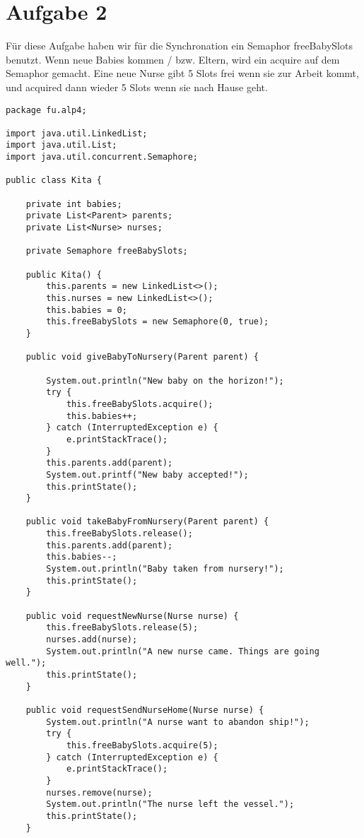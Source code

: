 \section*{Aufgabe 2}

Für diese Aufgabe haben wir für die Synchronation ein Semaphor freeBabySlots benutzt. Wenn neue Babies kommen / bzw. Eltern, wird ein acquire auf dem Semaphor gemacht. Eine neue Nurse gibt 5 Slots frei wenn sie zur Arbeit kommt, und acquired dann wieder 5 Slots wenn sie nach Hause geht.

\begin{lstlisting}[style=java]
package fu.alp4;

import java.util.LinkedList;
import java.util.List;
import java.util.concurrent.Semaphore;

public class Kita {

    private int babies;
    private List<Parent> parents;
    private List<Nurse> nurses;

    private Semaphore freeBabySlots;

    public Kita() {
        this.parents = new LinkedList<>();
        this.nurses = new LinkedList<>();
        this.babies = 0;
        this.freeBabySlots = new Semaphore(0, true);
    }

    public void giveBabyToNursery(Parent parent) {

        System.out.println("New baby on the horizon!");
        try {
            this.freeBabySlots.acquire();
            this.babies++;
        } catch (InterruptedException e) {
            e.printStackTrace();
        }
        this.parents.add(parent);
        System.out.printf("New baby accepted!");
        this.printState();
    }

    public void takeBabyFromNursery(Parent parent) {
        this.freeBabySlots.release();
        this.parents.add(parent);
        this.babies--;
        System.out.println("Baby taken from nursery!");
        this.printState();
    }

    public void requestNewNurse(Nurse nurse) {
        this.freeBabySlots.release(5);
        nurses.add(nurse);
        System.out.println("A new nurse came. Things are going well.");
        this.printState();
    }

    public void requestSendNurseHome(Nurse nurse) {
        System.out.println("A nurse want to abandon ship!");
        try {
            this.freeBabySlots.acquire(5);
        } catch (InterruptedException e) {
            e.printStackTrace();
        }
        nurses.remove(nurse);
        System.out.println("The nurse left the vessel.");
        this.printState();
    }


\end{lstlisting}
